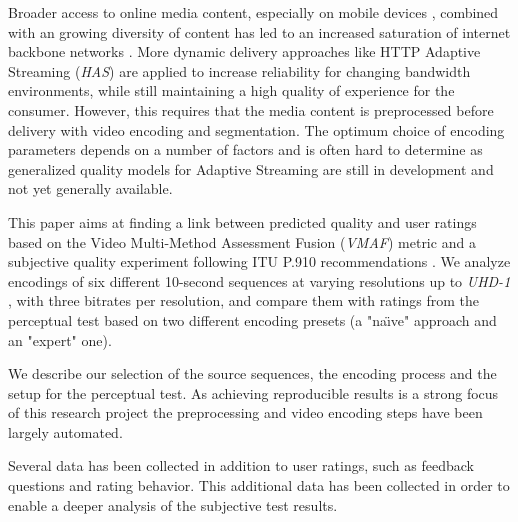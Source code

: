 Broader access to online media content, especially on mobile devices \cite{forecast2016cisco}, combined with an growing diversity of content has led to an increased saturation of internet backbone networks \cite{sandvine2010global}. More dynamic delivery approaches like HTTP Adaptive Streaming (\textit{HAS})\cite{seufert:2015:hassurvey} are applied to increase reliability for changing bandwidth environments, while still maintaining a high quality of experience for the consumer. However, this requires that the media content is preprocessed before delivery with video encoding and segmentation. The optimum choice of encoding parameters depends on a number of factors and is often hard to determine as generalized quality models for Adaptive Streaming are still in development \cite{raake:2017:hasqualitymodel} and not yet generally available. 

This paper aims at finding a link between predicted quality and user ratings based on the Video Multi-Method Assessment Fusion (\textit{VMAF}) metric \cite{lin2013:mmf,lin2014:fvqa} and a subjective quality experiment following ITU P.910 recommendations \cite{rec1998p}. We analyze encodings of six different 10-second sequences at varying resolutions up to \textit{UHD-1} \cite{dvb:2015:uhd1}, with three bitrates per resolution, and compare them with ratings from the perceptual test based on two different encoding presets (a "na\"{\i}ve" approach and an "expert" one).

We describe our selection of the source sequences, the encoding process and the setup for the perceptual test. As achieving reproducible results is a strong focus of this research project the preprocessing and video encoding steps have been largely automated.

Several data has been collected in addition to user ratings, such as feedback questions and rating behavior. This additional data has been collected in order to enable a deeper analysis of the subjective test results.